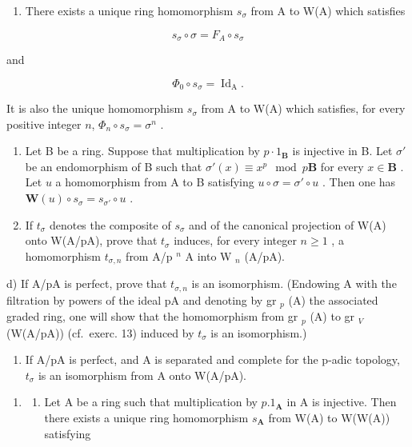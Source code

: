 \begin{enumerate}
\def\labelenumi{\alph{enumi})}
\tightlist
\item
  There exists a unique ring homomorphism \(s_{\sigma}\) from A to W(A) which satisfies
\end{enumerate}

\[
s _ {\sigma} \circ \sigma = F _ {A} \circ s _ {\sigma}
\]

and

\[
\Phi_ {0} \circ s _ {\sigma} = \operatorname{Id} _ {\mathrm{A}}.
\]

  It is also the unique homomorphism \(s_{\sigma}\) from A to W(A) which satisfies, for every positive integer \(n\), \(\Phi_{n} \circ s_{\sigma} = \sigma^{n}\) .

\begin{enumerate}
\def\labelenumi{\alph{enumi})}
\setcounter{enumi}{1}
\item
  Let B be a ring. Suppose that multiplication by \(p \cdot 1_{\mathbf{B}}\) is injective in B. Let \(\sigma'\) be an endomorphism of B such that \(\sigma'(x) \equiv x^p \mod p\mathbf{B}\) for every \(x \in \mathbf{B}\) . Let \(u\) a homomorphism from A to B satisfying \(u \circ \sigma = \sigma' \circ u\) . Then one has \(\mathbf{W}(u) \circ s_{\sigma} = s_{\sigma'} \circ u\) .
\item
  If \(t_{\sigma}\) denotes the composite of \(s_{\sigma}\) and of the canonical projection of W(A) onto W(A/pA), prove that \(t_{\sigma}\) induces, for every integer \(n \geqslant 1\) , a homomorphism \(t_{\sigma,n}\) from A/p \(^{n}\) A into W \(_{n}\) (A/pA).
\end{enumerate}

d) If A/pA is perfect, prove that \(t_{\sigma,n}\) is an isomorphism. (Endowing A with the filtration by powers of the ideal pA and denoting by gr \(_{p}\) (A) the associated graded ring, one will show that the homomorphism from gr \(_{p}\) (A) to gr \(_{V}\) (W(A/pA)) (cf.~exerc. 13) induced by \(t_{\sigma}\) is an isomorphism.)

\begin{enumerate}
\def\labelenumi{\alph{enumi})}
\setcounter{enumi}{4}
\tightlist
\item
  If A/pA is perfect, and A is separated and complete for the p-adic topology, \(t_{\sigma}\) is an isomorphism from A onto W(A/pA).
\end{enumerate}

\begin{enumerate}
\def\labelenumi{\arabic{enumi})}
\setcounter{enumi}{14}
\tightlist
\item
  \begin{enumerate}
  \def\labelenumii{\alph{enumii})}
  \tightlist
  \item
    Let A be a ring such that multiplication by \(p.1_{\mathbf{A}}\) in A is injective. Then there exists a unique ring homomorphism \(s_{\mathbf{A}}\) from W(A) to W(W(A)) satisfying
  \end{enumerate}
\end{enumerate}

